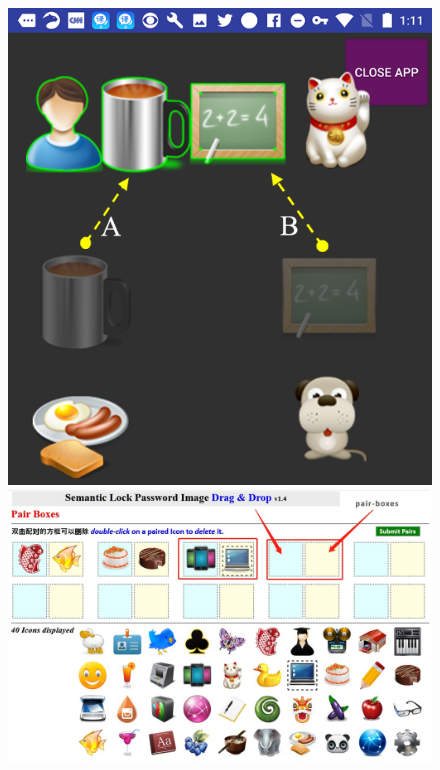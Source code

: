 \begin{anexos}
\begin{figure}[H]
\end{figure}




\begin{figure}[H]
	\centering
	\begin{minipage}{0.5\linewidth}  %
		\centering
		\includegraphics[width=0.8\linewidth]{semantoc-psw-2.png} %
		
	\end{minipage}%
	\hfill
	\begin{minipage}{0.5\linewidth} %
		\centering
		\includegraphics[width=0.8\linewidth]{semantic-psww1.jpg} %
		
	\end{minipage}
	\label{semantic-passw}
\end{figure}



\end{anexos}
